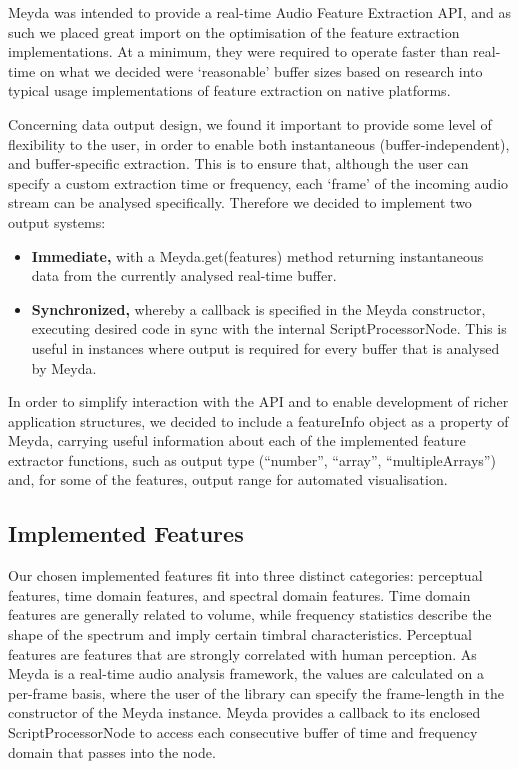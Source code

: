 \documentclass{sig-alternate}
\begin{document}
Meyda was intended to provide a real-time Audio Feature Extraction API, and as such we placed great import on the optimisation of the feature extraction implementations. At a minimum, they were required to operate faster than real-time on what we decided were `reasonable' buffer sizes based on research into typical usage implementations of feature extraction on native platforms.

Concerning data output design, we found it important to provide some level of flexibility to the user, in order to enable both instantaneous (buffer-independent), and buffer-specific extraction. This is to ensure that, although the user can specify a custom extraction time or frequency, each `frame' of the incoming audio stream can be analysed specifically. Therefore we decided to implement two output systems:

\begin{itemize}
	\item \textbf{Immediate,} with a Meyda.get(features) method returning instantaneous data from the currently analysed real-time buffer.
	\item \textbf{Synchronized,} whereby a callback is specified in the Meyda constructor, executing desired code in sync with the internal \mbox{ScriptProcessorNode}. This is useful in instances where output is required for every buffer that is analysed by Meyda.
\end{itemize}

In order to simplify interaction with the API and to enable development of richer application structures, we decided to include a featureInfo object as a property of Meyda, carrying useful information about each of the implemented feature extractor functions, such as output type (``number'', ``array'', ``multipleArrays'') and, for some of the features, output range for automated visualisation.

\subsection{Implemented Features}
Our chosen implemented features fit into three distinct categories: perceptual features, time domain features, and spectral domain features. Time domain features are generally related to volume, while frequency statistics describe the shape of the spectrum and imply certain timbral characteristics. Perceptual features are features that are strongly correlated with human perception. As Meyda is a real-time audio analysis framework, the values are calculated on a per-frame basis, where the user of the library can specify the frame-length in the constructor of the Meyda instance. Meyda provides a callback to its enclosed \mbox{ScriptProcessorNode} to access each consecutive buffer of time and frequency domain that passes into the node.
\end{document}
